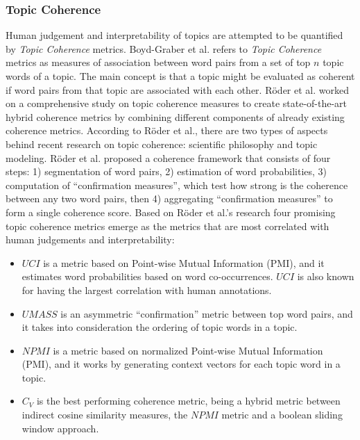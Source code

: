         \subsubsection{Topic Coherence\label{background:T_coherence}}
            Human judgement and interpretability of topics are attempted to be quantified by \emph{Topic Coherence} metrics. Boyd-Graber et al. \cite{boyd2014care} refers to \emph{Topic Coherence} metrics as measures of association between word pairs from a set of top $n$ topic words of a topic. The main concept is that a topic might be evaluated as coherent if word pairs from that topic are associated with each other. R{\"o}der et al. \cite{roder2015exploring} worked on a comprehensive study on topic coherence measures to create state-of-the-art hybrid coherence metrics by combining different components of already existing coherence metrics. According to R{\"o}der et al., there are two types of aspects behind recent research on topic coherence: scientific philosophy and topic modeling. R{\"o}der et al. proposed a coherence framework that consists of four steps: 1) segmentation of word pairs, 2) estimation of word probabilities, 3) computation of ``confirmation measures'', which test how strong is the coherence between any two word pairs, then 4) aggregating ``confirmation measures'' to form a single coherence score. Based on R{\"o}der et al.'s research four promising topic coherence metrics emerge as the metrics that are most correlated with human judgements and interpretability:
                \begin{itemize}
                    \item $UCI$ is a metric based on Point-wise Mutual Information (PMI), and it estimates word probabilities based on word co-occurrences. $UCI$ is also known for having the largest correlation with human annotations.
                    \item $UMASS$ is an asymmetric ``confirmation'' metric between top word pairs, and it takes into consideration the ordering of topic words in a topic.
                    \item $NPMI$ is a metric based on normalized Point-wise Mutual Information (PMI), and it works by generating context vectors for each topic word in a topic.
                    \item $C_V$ is the best performing coherence metric, being a hybrid metric between indirect cosine similarity measures, the $NPMI$ metric and a boolean sliding window approach.
                \end{itemize}
                
